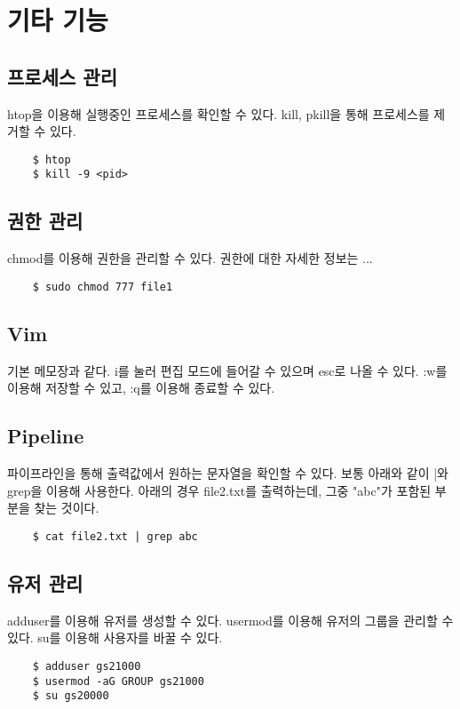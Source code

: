 \section{기타 기능}
\subsection{프로세스 관리}
htop을 이용해 실행중인 프로세스를 확인할 수 있다. kill, pkill을 통해 프로세스를 제거할 수 있다.
    \begin{lstlisting}
    $ htop
    $ kill -9 <pid>
    \end{lstlisting}
\subsection{권한 관리}
chmod를 이용해 권한을 관리할 수 있다. 권한에 대한 자세한 정보는 ...
    \begin{lstlisting}
    $ sudo chmod 777 file1
    \end{lstlisting}
\subsection{Vim}
기본 메모장과 같다. i를 눌러 편집 모드에 들어갈 수 있으며 esc로 나올 수 있다. :w를 이용해 저장할 수 있고, :q를 이용해 종료할 수 있다. 
\subsection{Pipeline}
파이프라인을 통해 출력값에서 원하는 문자열을 확인할 수 있다. 보통 아래와 같이 |와 grep을 이용해 사용한다. 아래의 경우 file2.txt를 출력하는데, 그중 "abc"가 포함된 부분을 찾는 것이다.
    \begin{lstlisting}
    $ cat file2.txt | grep abc
    \end{lstlisting}
\subsection{유저 관리}
adduser를 이용해 유저를 생성할 수 있다. usermod를 이용해 유저의 그룹을 관리할 수 있다. su를 이용해 사용자를 바꿀 수 있다.
    \begin{lstlisting}
    $ adduser gs21000
    $ usermod -aG GROUP gs21000
    $ su gs20000
    \end{lstlisting}